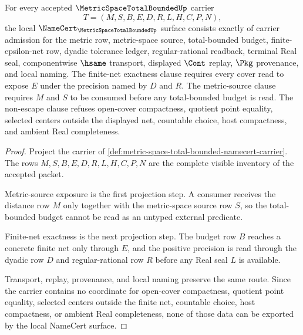 \begin{theorem}
\label{thm:metric-space-total-bounded-namecert-obligations}
For every accepted $\MetricSpaceTotalBoundedUp$ carrier
$$
T=(M,S,B,E,D,R,L,H,C,P,N),
$$
the local $\NameCert_{\MetricSpaceTotalBoundedUp}$ surface consists exactly of carrier admission for the metric row, metric-space source, total-bounded budget, finite-epsilon-net row, dyadic tolerance ledger, regular-rational readback, terminal Real seal, componentwise $\hsame$ transport, displayed $\Cont$ replay, $\Pkg$ provenance, and local naming. The finite-net exactness clause requires every cover read to expose $E$ under the precision named by $D$ and $R$. The metric-source clause requires $M$ and $S$ to be consumed before any total-bounded budget is read. The non-escape clause refuses open-cover compactness, quotient point equality, selected centers outside the displayed net, countable choice, host compactness, and ambient Real completeness.
\end{theorem}
\begin{proof}
Project the carrier of \autoref{def:metric-space-total-bounded-namecert-carrier}. The rows $M,S,B,E,D,R,L,H,C,P,N$ are the complete visible inventory of the accepted packet.

Metric-source exposure is the first projection step. A consumer receives the distance row $M$ only together with the metric-space source row $S$, so the total-bounded budget cannot be read as an untyped external predicate.

Finite-net exactness is the next projection step. The budget row $B$ reaches a concrete finite net only through $E$, and the positive precision is read through the dyadic row $D$ and regular-rational row $R$ before any Real seal $L$ is available.

Transport, replay, provenance, and local naming preserve the same route. Since the carrier contains no coordinate for open-cover compactness, quotient point equality, selected centers outside the finite net, countable choice, host compactness, or ambient Real completeness, none of those data can be exported by the local NameCert surface.
\end{proof}

